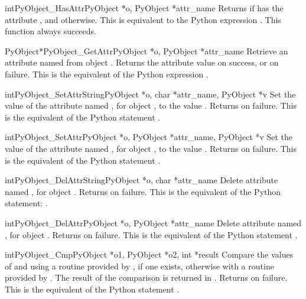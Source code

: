 \documentclass{manual}
\begin{document}
\begin{cfuncdesc}{int}{PyObject_HasAttr}{PyObject *o, PyObject *attr_name}
Returns  if  has the attribute , and
 otherwise.  This is equivalent to the Python expression
. 
This function always succeeds.
\end{cfuncdesc}


\begin{cfuncdesc}{PyObject*}{PyObject_GetAttr}{PyObject *o,
                                               PyObject *attr_name}
Retrieve an attribute named  from object .
Returns the attribute value on success, or \NULL{} on failure.
This is the equivalent of the Python expression
.
\end{cfuncdesc}


\begin{cfuncdesc}{int}{PyObject_SetAttrString}{PyObject *o, char *attr_name, PyObject *v}
Set the value of the attribute named , for object
, to the value . Returns  on failure.  This is
the equivalent of the Python statement .
\end{cfuncdesc}


\begin{cfuncdesc}{int}{PyObject_SetAttr}{PyObject *o, PyObject *attr_name, PyObject *v}
Set the value of the attribute named , for
object ,
to the value . Returns  on failure.  This is
the equivalent of the Python statement .
\end{cfuncdesc}


\begin{cfuncdesc}{int}{PyObject_DelAttrString}{PyObject *o, char *attr_name}
Delete attribute named , for object . Returns
 on failure.  This is the equivalent of the Python
statement: .
\end{cfuncdesc}


\begin{cfuncdesc}{int}{PyObject_DelAttr}{PyObject *o, PyObject *attr_name}
Delete attribute named , for object . Returns
 on failure.  This is the equivalent of the Python
statement .
\end{cfuncdesc}


\begin{cfuncdesc}{int}{PyObject_Cmp}{PyObject *o1, PyObject *o2, int *result}
Compare the values of  and  using a routine provided
by , if one exists, otherwise with a routine provided by
.  The result of the comparison is returned in .
Returns  on failure.  This is the equivalent of the Python
statement .
\end{cfuncdesc}
\end{document}
